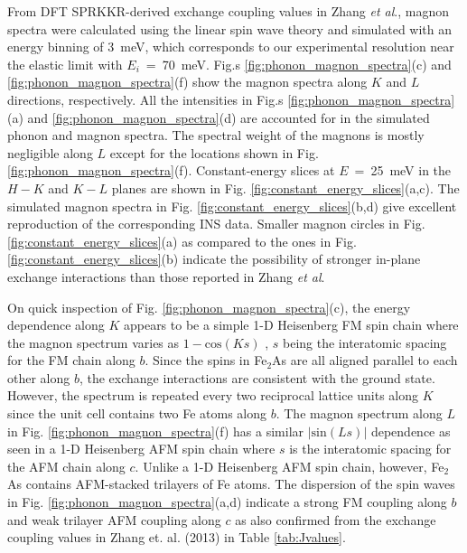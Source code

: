 \documentclass[letterpaper,10pt,doublespacing,edeposit]{uiucthesis2020}
\begin{document}
\begin{mainmatter}
From DFT SPRKKR-derived exchange coupling values in Zhang \emph{et al}.,\cite{Zhang2013} magnon spectra were calculated using the linear spin wave theory and simulated with an energy binning of 3~meV, which corresponds to our experimental resolution near the elastic limit with $E_i$~=~70~meV. Fig.s \ref{fig:phonon_magnon_spectra}(c) and \ref{fig:phonon_magnon_spectra}(f) show the magnon spectra along $K$ and $L$ directions, respectively. All the intensities in Fig.s \ref{fig:phonon_magnon_spectra}(a) and \ref{fig:phonon_magnon_spectra}(d) are accounted for in the simulated phonon and magnon spectra. The spectral weight of the magnons is mostly negligible along $L$ except for the locations shown in Fig. \ref{fig:phonon_magnon_spectra}(f). Constant-energy slices at $E$~=~25~meV in the $H-K$ and $K-L$ planes are shown in Fig. \ref{fig:constant_energy_slices}(a,c). The simulated magnon spectra in Fig. \ref{fig:constant_energy_slices}(b,d) give excellent reproduction of the corresponding INS data. Smaller magnon circles in Fig. \ref{fig:constant_energy_slices}(a) as compared to the ones in Fig. \ref{fig:constant_energy_slices}(b) indicate the possibility of stronger in-plane exchange interactions than those reported in Zhang \emph{et al}.\cite{Zhang2013}


On quick inspection of Fig. \ref{fig:phonon_magnon_spectra}(c), the energy dependence along $K$ appears to be a simple 1-D Heisenberg FM spin chain where the magnon spectrum varies as $1 - \textrm{cos} (Ks)$ \cite{Stancil}, $s$ being the interatomic spacing for the FM chain along $b$. Since the spins in Fe$_2$As are all aligned parallel to each other along $b$, the exchange interactions are consistent with the ground state. However, the spectrum is repeated every two reciprocal lattice units along $K$ since the unit cell contains two Fe atoms along $b$. The magnon spectrum along $L$ in Fig. \ref{fig:phonon_magnon_spectra}(f) has a similar $|\textrm{sin}(Ls)|$ dependence as seen in a 1-D Heisenberg AFM spin chain where $s$ is the interatomic spacing for the AFM chain along $c$. Unlike a 1-D Heisenberg AFM spin chain, however, Fe$_2$As contains AFM-stacked trilayers of Fe atoms. 
The dispersion of the spin waves in Fig. \ref{fig:phonon_magnon_spectra}(a,d) indicate a strong FM coupling along $b$ and weak trilayer AFM coupling along $c$ as also confirmed from the exchange coupling values in Zhang et. al. (2013) \cite{Zhang2013} in Table \ref{tab:Jvalues}.



\end{mainmatter}
\end{document}
